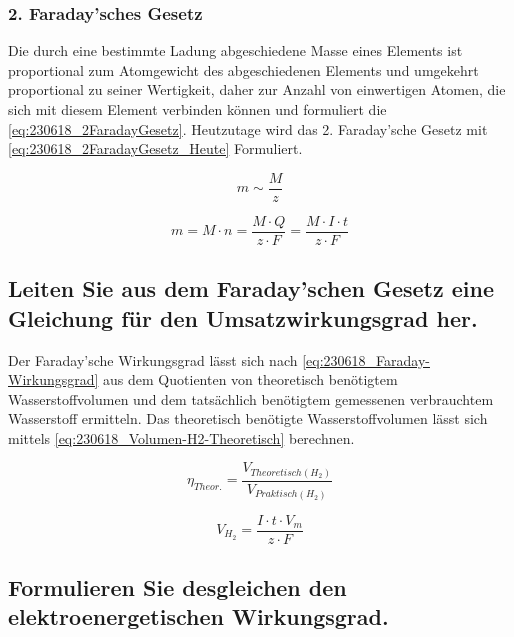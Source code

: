 \subsubsection{2. Faraday'sches Gesetz}

Die durch eine bestimmte Ladung abgeschiedene Masse eines Elements ist proportional zum Atomgewicht des abgeschiedenen Elements und umgekehrt proportional zu seiner Wertigkeit, daher zur Anzahl von einwertigen Atomen, die sich mit diesem Element verbinden können \cite{Faraday_G} und formuliert die \autoref{eq:230618_2FaradayGesetz}.
Heutzutage wird das 2. Faraday'sche Gesetz mit \autoref{eq:230618_2FaradayGesetz_Heute} Formuliert.

\begin{equation}
    m \sim \frac{M}{z}
    \label{eq:230618_2FaradayGesetz}
\end{equation}

\begin{equation}
    m = M \cdot n = \frac{M \cdot Q}{z \cdot F} = \frac{M \cdot I \cdot t}{z \cdot F}
    \label{eq:230618_2FaradayGesetz_Heute}
\end{equation}

\subsection{Leiten Sie aus dem Faraday'schen Gesetz eine Gleichung für den Umsatzwirkungsgrad her.}

Der Faraday'sche Wirkungsgrad lässt sich nach \autoref{eq:230618_Faraday-Wirkungsgrad} aus dem Quotienten von theoretisch benötigtem Wasserstoffvolumen und dem tatsächlich benötigtem gemessenen verbrauchtem Wasserstoff ermitteln.
Das theoretisch benötigte Wasserstoffvolumen lässt sich mittels \autoref{eq:230618_Volumen-H2-Theoretisch} berechnen.

\begin{equation}
    \eta_{Theor.} = \frac{V_{Theoretisch(H_2)}}{V_{Praktisch(H_2)}}
    \label{eq:230618_Faraday-Wirkungsgrad}
\end{equation}

\begin{equation}
    V_{H_2} = \frac{I \cdot t \cdot V_m}{z \cdot F}
    \label{eq:230618_Volumen-H2-Theoretisch}
\end{equation}

\subsection{Formulieren Sie desgleichen den elektroenergetischen Wirkungsgrad.}


